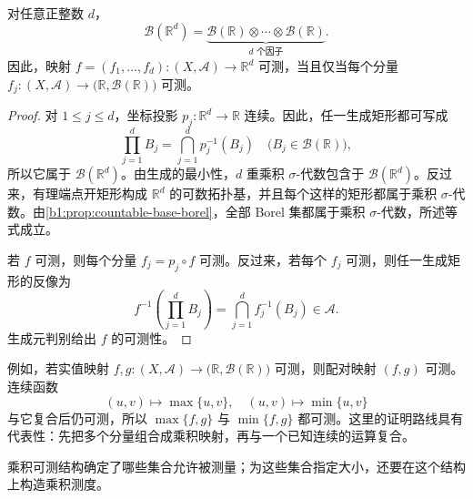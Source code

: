 \begin{proposition}
\label{b1:prop:euclidean-product-borel}
对任意正整数 \(d\)，
\[
\mathcal B(\mathbb R^d)
=\underbrace{\mathcal B(\mathbb R)\otimes\cdots\otimes\mathcal B(\mathbb R)}_{d\text{ 个因子}}.
\]
因此，映射
\(
f=(f_1,\ldots,f_d):(X,\mathcal A)\to\mathbb R^d
\)
可测，当且仅当每个分量 \(f_j:(X,\mathcal A)\to\bigl(\mathbb R,\mathcal B(\mathbb R)\bigr)\) 可测。
\end{proposition}
\begin{proof}
对 \(1\leq j\leq d\)，坐标投影 \(p_j:\mathbb R^d\to\mathbb R\) 连续。因此，任一生成矩形都可写成
\[
\prod_{j=1}^{d}B_j
=\bigcap_{j=1}^{d}p_j^{-1}(B_j)
\quad\bigl(B_j\in\mathcal B(\mathbb R)\bigr),
\]
所以它属于 \(\mathcal B(\mathbb R^d)\)。由生成的最小性，\(d\) 重乘积 \(\sigma\)-代数包含于 \(\mathcal B(\mathbb R^d)\)。反过来，有理端点开矩形构成 \(\mathbb R^d\) 的可数拓扑基，并且每个这样的矩形都属于乘积 \(\sigma\)-代数。由\cref{b1:prop:countable-base-borel}，全部 Borel 集都属于乘积 \(\sigma\)-代数，所述等式成立。

若 \(f\) 可测，则每个分量 \(f_j=p_j\circ f\) 可测。反过来，若每个 \(f_j\) 可测，则任一生成矩形的反像为
\[
f^{-1}\left(\prod_{j=1}^{d}B_j\right)
=\bigcap_{j=1}^{d}f_j^{-1}(B_j)
\in\mathcal A.
\]
生成元判别给出 \(f\) 的可测性。
\end{proof}

例如，若实值映射 \(f,g:(X,\mathcal A)\to\bigl(\mathbb R,\mathcal B(\mathbb R)\bigr)\) 可测，则配对映射 \((f,g)\) 可测。连续函数
\[
(u,v)\longmapsto \max\{u,v\},
\quad
(u,v)\longmapsto \min\{u,v\}
\]
与它复合后仍可测，所以 \(\max\{f,g\}\) 与 \(\min\{f,g\}\) 都可测。这里的证明路线具有代表性：先把多个分量组合成乘积映射，再与一个已知连续的运算复合。

\ProseParagraphBreak

乘积可测结构确定了哪些集合允许被测量；为这些集合指定大小，还要在这个结构上构造乘积测度。
